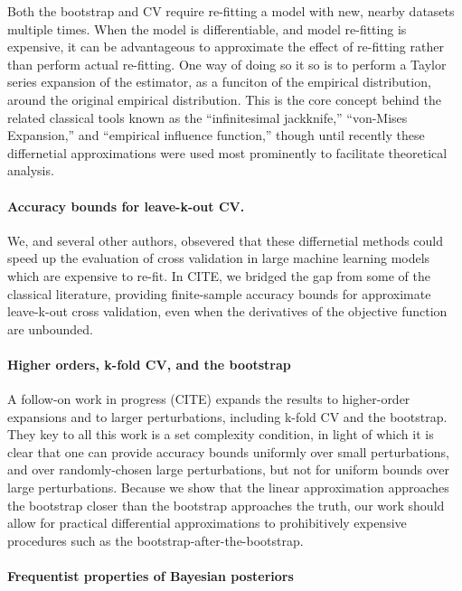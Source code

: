 Both the bootstrap and CV require re-fitting a model with new, nearby datasets
multiple times.  When the model is differentiable, and model re-fitting is
expensive, it can be advantageous to approximate the effect of re-fitting rather
than perform actual re-fitting.  One way of doing so it so is to perform a
Taylor series expansion of the estimator, as a funciton of the empirical
distribution, around the original empirical distribution.  This is the core
concept behind the related classical tools known as the ``infinitesimal
jackknife,'' ``von-Mises Expansion,'' and ``empirical influence function,''
though until recently these differnetial approximations were used most
prominently to facilitate theoretical analysis.


\paragraph{Accuracy bounds for leave-k-out CV.}

We, and several other authors, obsevered that these differnetial methods
could speed up the evaluation of cross validation in large machine learning
models which are expensive to re-fit.  In CITE, we bridged the gap from
some of the classical literature, providing finite-sample accuracy bounds
for approximate leave-k-out cross validation, even when the derivatives of
the objective function are unbounded.


\paragraph{Higher orders, k-fold CV, and the bootstrap}

A follow-on work in progress (CITE) expands the results to higher-order
expansions and to larger perturbations, including k-fold CV and the bootstrap.
They key to all this work is a set complexity condition, in light of which it is
clear that one can provide accuracy bounds uniformly over small perturbations,
and over randomly-chosen large perturbations, but not for uniform bounds over
large perturbations.  Because we show that the linear approximation approaches
the bootstrap closer than the bootstrap approaches the truth, our work
should allow for practical differential approximations to prohibitively
expensive procedures such as the bootstrap-after-the-bootstrap.


\paragraph{Frequentist properties of Bayesian posteriors}

